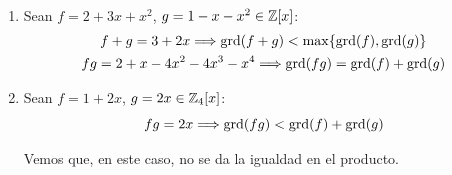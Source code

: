 \begin{ejemplo}\
\begin{enumerate}
    \item Sean $f=2+3x+x^2$, $g=1-x-x^2 \in \mathbb Z[x]$:
    \begin{gather*}
        f+g = 3 + 2x \Longrightarrow \operatorname{grd}(f+g) < \max\{\operatorname{grd}(f), \operatorname{grd}(g)\} \\
        fg = 2+x-4x^2-4x^3-x^4 \Longrightarrow \operatorname{grd}(fg) = \operatorname{grd}(f) + \operatorname{grd}(g)
    \end{gather*}

    \item Sean $f=1+2x$, $g=2x \in \mathbb Z_4[x]$:
    $$fg = 2x \Longrightarrow \operatorname{grd}(fg) < \operatorname{grd}(f) + \operatorname{grd}(g)$$

    Vemos que, en este caso, no se da la igualdad en el producto.
\end{enumerate}
\end{ejemplo}

